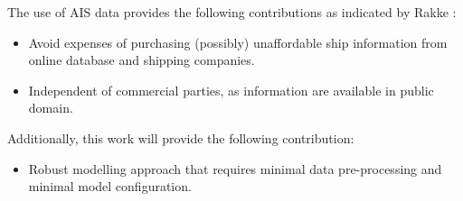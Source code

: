 The use of AIS data provides the following contributions as indicated by Rakke \cite{Rakke2016}: 

\begin{itemize}
    \item Avoid expenses of purchasing (possibly) unaffordable ship information from online database and shipping companies. 
    \item Independent of commercial parties, as information are available in public domain.
\end{itemize}

Additionally, this work will provide the following contribution:

\begin{itemize}
    \item Robust modelling approach that requires minimal data pre-processing and minimal model configuration.
\end{itemize} 






 






